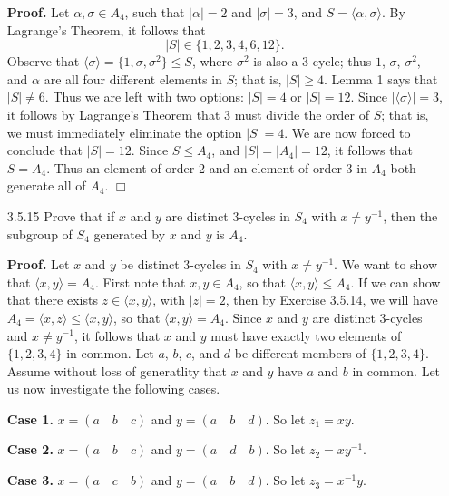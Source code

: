 \documentclass[9pt]{article}
\newcommand{\qed}{\hfill \ensuremath{\Box}}
\newcommand{\cyc}[1]{\langle #1 \rangle}
\begin{document}
\begin{enumerate}
      \textbf{Proof.} Let $\alpha, \sigma \in A_4$, such that $|\alpha| = 2$
      and $|\sigma| = 3$, and $S = \cyc{\alpha, \sigma}$. By Lagrange's
      Theorem, it follows that
      $$|S| \in \{1, 2, 3, 4, 6, 12\}.$$
      Observe that $\cyc{\sigma} = \{1, \sigma, \sigma^2\} \le S$, where
      $\sigma^2$ is also a 3-cycle; thus $1$, $\sigma$, $\sigma^2$, and
      $\alpha$ are all four different elements in $S$; that is, $|S| \ge 4$.
      Lemma 1 says that $|S| \neq 6$. Thus we are left with two options:
      $|S| = 4$ or $|S| = 12$. Since $|\cyc{\sigma}| = 3$, it follows by
      Lagrange's Theorem that $3$ must divide the order of $S$; that is, we
      must immediately eliminate the option $|S| = 4$. We are now forced to
      conclude that $|S| = 12$. Since $S \le A_4$, and $|S| = |A_4| = 12$, it
      follows that $S = A_4$. Thus an element of order 2 and an element of order
      3 in $A_4$ both generate all of $A_4$. \qed
   \item[3.5.15]  Prove that if $x$ and $y$ are distinct 3-cycles in $S_4$ with
                  $x \neq y^{-1}$, then the subgroup of $S_4$ generated by $x$
                  and $y$ is $A_4$.
                  
      \textbf{Proof.} Let $x$ and $y$ be distinct 3-cycles in $S_4$ with
      $x \neq y^{-1}$. We want to show that $\cyc{x, y} = A_4$. First note that
      $x, y \in A_4$, so that $\cyc{x, y} \le A_4$. If we can show that there
      exists $z \in \cyc{x, y}$, with $|z| = 2$, then by Exercise
      3.5.14, we will have $A_4 = \cyc{x, z} \le \cyc{x, y}$, so that
      $\cyc{x, y} = A_4$. Since $x$ and $y$ are distinct 3-cycles and
      $x \neq y^{-1}$, it follows that $x$ and $y$ must have exactly two
      elements of $\{1, 2, 3, 4\}$ in common. Let $a$, $b$, $c$, and $d$ be
      different members of $\{1, 2, 3, 4\}$. Assume without loss of generatlity
      that $x$ and $y$ have $a$ and $b$ in common. Let us now investigate the
      following cases. 
      
      \textbf{Case 1.} $x = (a \quad b \quad c)$ and $y = (a \quad b \quad d)$.
      So let $z_1 = xy$.
      
      \textbf{Case 2.} $x = (a \quad b \quad c)$ and $y = (a \quad d \quad b)$.      
      So let $z_2 = xy^{-1}$.
      
      \textbf{Case 3.} $x = (a \quad c \quad b)$ and $y = (a \quad b \quad d)$.      
      So let $z_3 = x^{-1}y$.
      

\end{enumerate}
\end{document}
